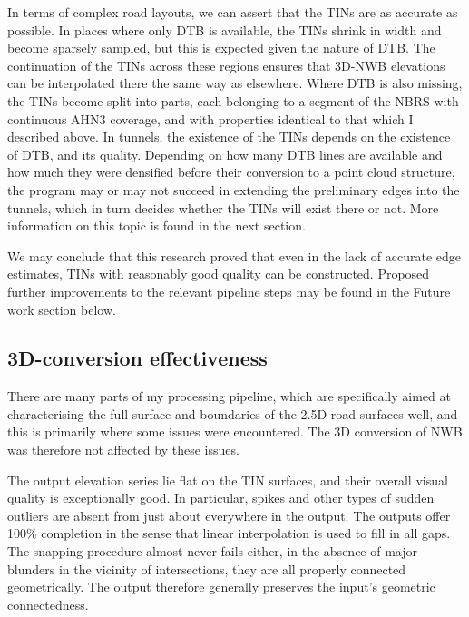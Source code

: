 In terms of complex road layouts, we can assert that the TINs are as accurate as possible. In places where only DTB is available, the TINs shrink in width and become sparsely sampled, but this is expected given the nature of DTB. The continuation of the TINs across these regions ensures that 3D-NWB elevations can be interpolated there the same way as elsewhere. Where DTB is also missing, the TINs become split into parts, each belonging to a segment of the NBRS with continuous AHN3 coverage, and with properties identical to that which I described above. In tunnels, the existence of the TINs depends on the existence of DTB, and its quality. Depending on how many DTB lines are available and how much they were densified before their conversion to a point cloud structure, the program may or may not succeed in extending the preliminary edges into the tunnels, which in turn decides whether the TINs will exist there or not. More information on this topic is found in the next section.

We may conclude that this research proved that even in the lack of accurate edge estimates, TINs with reasonably good quality can be constructed. Proposed further improvements to the relevant pipeline steps may be found in the Future work section below.

\subsection{3D-conversion effectiveness}
\label{sub:effectivenessconversion}

There are many parts of my processing pipeline, which are specifically aimed at characterising the full surface and boundaries of the 2.5D road surfaces well, and this is primarily where some issues were encountered. The 3D conversion of NWB was therefore not affected by these issues.

The output elevation series lie flat on the TIN surfaces, and their overall visual quality is exceptionally good. In particular, spikes and other types of sudden outliers are absent from just about everywhere in the output. The outputs offer 100\% completion in the sense that linear interpolation is used to fill in all gaps. The snapping procedure almost never fails either, in the absence of major blunders in the vicinity of intersections, they are all properly connected geometrically. The output therefore generally preserves the input's geometric connectedness.

